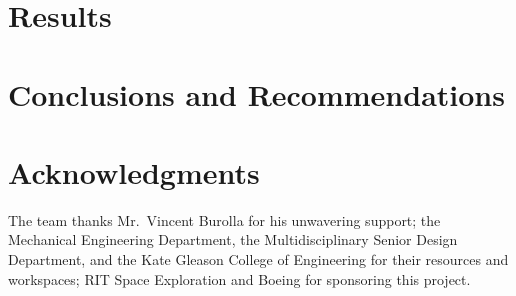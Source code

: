 \documentclass[journal]{IEEEtran}
\begin{document}
\section{Results}

\section{Conclusions and Recommendations}

\section*{Acknowledgments}
The team thanks Mr.\ Vincent Burolla for his unwavering support; the Mechanical Engineering Department, the Multidisciplinary Senior Design Department, and the Kate Gleason College of Engineering for their resources and workspaces; RIT Space Exploration and Boeing for sponsoring this project.



\end{document}
